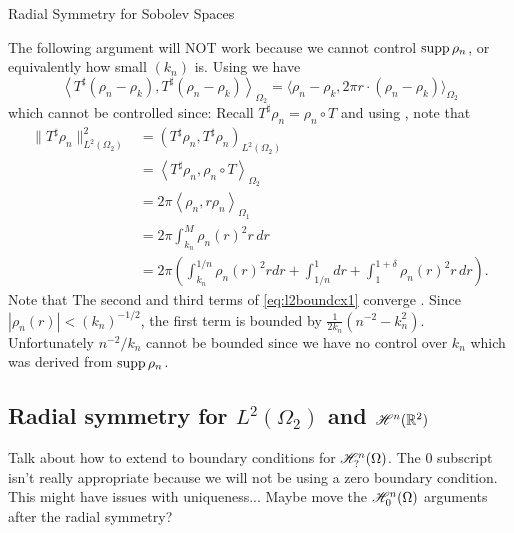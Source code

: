 \begin{chapter}{Radial Symmetry for Sobolev Spaces}
\begin{com}
The following argument will NOT work because we cannot control $\operatorname*{supp} \rho_n$, or equivalently how small $(k_n)$ is.
Using  we have 
\begin{equation}
  \left\langle T^\sharp (\rho_n - \rho_k), T^{\sharp}(\rho_n-\rho_k)\right\rangle_{\Omega_2} =\Big\langle \rho_n - \rho_k, 2\pi r\cdot (\rho_n-\rho_k)\Big\rangle_{\Omega_2}
\end{equation}
which cannot be controlled since:
Recall $T^\sharp \rho_n = \rho_n \circ T$ and using , note that
\begin{align}
  \|T^\sharp \rho_n\|_{L^2(\Omega_2)}^2 
    &= (T^\sharp \rho_n,T^\sharp \rho_n)_{L^2(\Omega_2)} \nonumber\\
    &= \left\langle T^\sharp \rho_n,\rho_n\circ T\right\rangle_{\Omega_2} \nonumber \\
    &= 2\pi\left\langle \rho_n,r \rho_n\right\rangle_{\Omega_1} \nonumber \\
    &= 2\pi\int_{k_n}^M \rho_n(r)^2r\,dr \nonumber \\
    &= 2\pi\left(\int_{k_n}^{1/n} \rho_n(r)^2rdr + \int_{1/n}^1 dr + \int_{1}^{1+\delta}\rho_n(r)^2 r\,dr\right). \label{eq:l2boundcx1}
\end{align}
Note that The second and third terms of \eqref{eq:l2boundcx1} converge .
Since $|\rho_n(r)| < (k_n)^{-1/2}$, the first term is bounded by $\frac1{2k_n}(n^{-2} - k_n^2)$. 
Unfortunately $n^{-2}/k_n$ cannot be bounded since we have no control over $k_n$ which was derived from $\operatorname*{supp} \rho_n$. 
\end{com}

\subsection{Radial symmetry for $L^2(\Omega_2)$ and $\mathscr H^n(\mathbb R^2)$}
\begin{com}
  Talk about how to extend to boundary conditions for $\mathscr H^n_{?}(\Omega)$.
  The $0$ subscript isn't really appropriate because we will not be using a zero boundary condition.
  This might have issues with uniqueness...
  Maybe move the $\mathscr H^n_0(\Omega)$ arguments after the radial symmetry?
\end{com}


\end{chapter}

